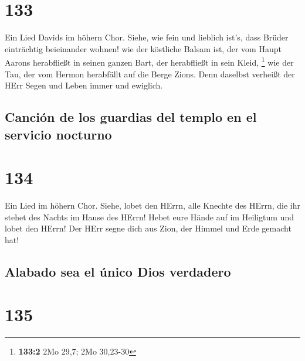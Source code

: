 \hypertarget{section-132}{%
\section{133}\label{section-132}}

 Ein Lied Davids im höhern Chor. Siehe, wie fein und
lieblich ist's, dass Brüder einträchtig beieinander wohnen!
 wie der köstliche Balsam ist, der vom Haupt Aarons
herabfließt in seinen ganzen Bart, der herabfließt in sein Kleid,
\footnote{\textbf{133:2} 2Mo 29,7; 2Mo 30,23-30}  wie der
Tau, der vom Hermon herabfällt auf die Berge Zions. Denn daselbst
verheißt der HErr Segen und Leben immer und ewiglich.

\hypertarget{canciuxf3n-de-los-guardias-del-templo-en-el-servicio-nocturno}{%
\subsection{Canción de los guardias del templo en el servicio
nocturno}\label{canciuxf3n-de-los-guardias-del-templo-en-el-servicio-nocturno}}

\hypertarget{section-133}{%
\section{134}\label{section-133}}

 Ein Lied im höhern Chor. Siehe, lobet den HErrn, alle
Knechte des HErrn, die ihr stehet des Nachts im Hause des HErrn!
 Hebet eure Hände auf im Heiligtum und lobet den HErrn!
 Der HErr segne dich aus Zion, der Himmel und Erde gemacht
hat!

\hypertarget{alabado-sea-el-uxfanico-dios-verdadero}{%
\subsection{Alabado sea el único Dios
verdadero}\label{alabado-sea-el-uxfanico-dios-verdadero}}

\hypertarget{section-134}{%
\section{135}\label{section-134}}

